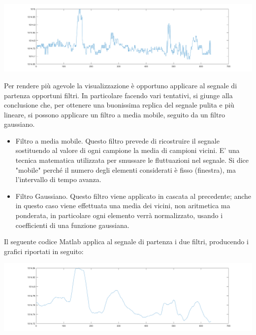 \documentclass[a4paper]{article}
\begin{document}
\makebox[\linewidth]{}
\makebox[\linewidth]{}
\begin{minipage}{\linewidth}
\begin{center}
\includegraphics[width=160mm,scale=0.7]{./images/segnali/pressure_phone_grezzo.png} 
\end{center}
\end{minipage}
\makebox[\linewidth]{}
\makebox[\linewidth]{} 
\makebox[\linewidth]{} 
Per rendere più agevole la visualizzazione è opportuno applicare al segnale di partenza opportuni filtri. In particolare facendo vari tentativi, si giunge alla conclusione che, per ottenere una buonissima replica del segnale pulita e più lineare, si possono applicare un filtro a media mobile, seguito da un filtro gaussiano.
\begin {itemize}
\item Filtro a media mobile. Questo filtro prevede di ricostruire il segnale sostituendo al valore di ogni campione la media di campioni vicini. E’ una tecnica matematica utilizzata per smussare le fluttuazioni nel segnale. Si dice "mobile" perché il numero degli elementi considerati è fisso (finestra), ma l'intervallo di tempo avanza.
\item Filtro Gaussiano. Questo filtro viene applicato in cascata al precedente; anche in questo caso viene effettuata una media dei vicini, non aritmetica ma ponderata, in particolare ogni elemento verrà normalizzato, usando i coefficienti di una funzione gaussiana.
\end{itemize}
Il seguente codice Matlab applica al segnale di partenza i due filtri, producendo i grafici riportati in seguito: \\

\makebox[\linewidth]{}
\makebox[\linewidth]{}
\begin{minipage}{\linewidth}
\begin{center}
\includegraphics[width=160mm,scale=0.7]{./images/segnali/pressure_phone_movmean.png} 
\end{center}
\end{minipage}
\end{document}
